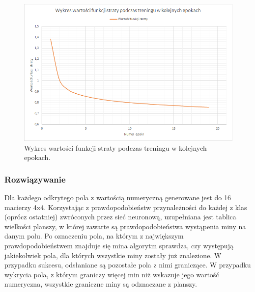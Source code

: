 \documentclass[letterpaper,12pt]{article}
\begin{document}
\begin{figure}[H]
    \centering
    \includegraphics[scale=0.6]{funkcjastraty.png}
    \caption{Wykres wartości funkcji straty podczas treningu w kolejnych epokach.}
\end{figure} 
\subsubsection*{Rozwiązywanie}
Dla każdego odkrytego pola z wartością numeryczną generowane jest do 16 macierzy 4x4. Korzystając z prawdopodobieństw przynależności do każdej z klas (oprócz ostatniej) zwróconych przez sieć neuronową, uzupełniana jest tablica wielkości planszy,
w której zawarte są prawdopodobieństwa wystąpenia miny na danym polu. Po oznaczeniu pola, na którym z największym prawdopodobieństwem znajduje się mina algorytm sprawdza, czy występują jakiekolwiek pola, dla których wszystkie miny zostały już znalezione. W przypadku sukcesu, 
odsłaniane są pozostałe pola z nimi graniczące. W przypadku wykrycia pola, z którym graniczy więcej min niż wskazuje jego wartość numeryczna, wszystkie graniczne miny są odznaczane z planszy. 
\end{document}
